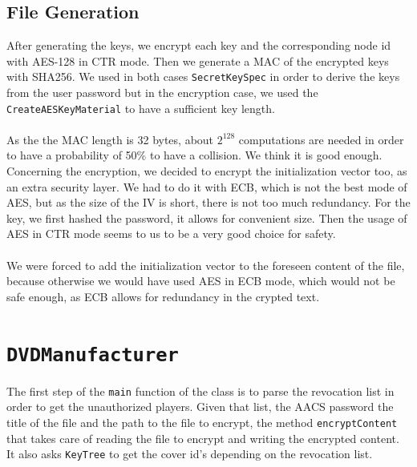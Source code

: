 \documentclass[a4paper,titlepage]{article}
\begin{document}
	\subsection{File Generation}
	After generating the keys, we encrypt each key and the corresponding node id with AES-128 in CTR mode. Then we generate a MAC of the encrypted keys with SHA256. We used in both cases \texttt{SecretKeySpec} in order to derive the keys from the user password but in the encryption case, we used the \texttt{CreateAESKeyMaterial} to have a sufficient key length. \\ \\ 
	As the the MAC length is 32 bytes, about $2^{128}$ computations are needed in order to have a probability of 50\% to have a collision. We think it is good enough. Concerning the encryption, we decided to encrypt the initialization vector too, as an extra security layer. We had to do it with ECB, which is not the best mode of AES, but as the size of the IV is short, there is not too much redundancy. For the key, we first hashed the password, it allows for convenient size. Then the usage of AES in CTR mode seems to us to be a very good choice for safety. \\ \\
	We were forced to add the initialization vector to the foreseen content of the file, because otherwise we would have used AES in ECB mode, which would not be safe enough, as ECB allows for redundancy in the crypted text.

\section{\texttt{DVDManufacturer}}

The first step of the \texttt{main} function of the class is to parse the revocation list in order to get the unauthorized players. Given that list, the AACS password the title of the file and the path to the file to encrypt, the method \texttt{encryptContent} that takes care of reading the file to encrypt and writing the encrypted content. It also asks \texttt{KeyTree} to get the cover id's depending on the revocation list.
\end{document}
